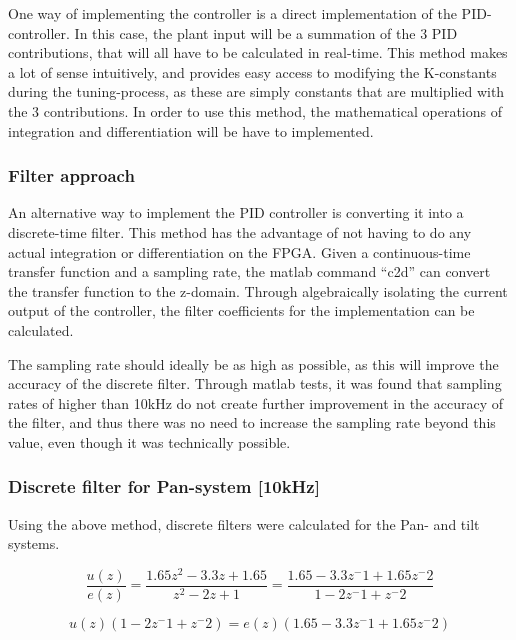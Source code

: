One way of implementing the controller is a direct implementation of the PID-controller. In this case, the plant input will be a summation of the 3 PID contributions, that will all have to be calculated in real-time. This method makes a lot of sense intuitively, and provides easy access to modifying the K-constants during the tuning-process, as these are simply constants that are multiplied with the 3 contributions. In order to use this method, the mathematical operations of integration and differentiation will be have to implemented.


\subsubsection{Filter approach}

An alternative way to implement the PID controller is converting it into a discrete-time filter. This method has the advantage of not having to do any actual integration or differentiation on the FPGA. Given a continuous-time transfer function and a sampling rate, the matlab command “c2d” can convert the transfer function to the z-domain. Through algebraically isolating the current output of the controller, the filter coefficients for the implementation can be calculated.\par

The sampling rate should ideally be as high as possible, as this will improve the accuracy of the discrete filter. Through matlab tests, it was found that sampling rates of higher than 10kHz do not create further improvement in the accuracy of the filter, and thus there was no need to increase the sampling rate beyond this value, even though it was technically possible.

\subsubsection{Discrete filter for Pan-system [10kHz]}

Using the above method, discrete filters were calculated for the Pan- and tilt systems.

\begin{equation}
\frac{u(z)}{e(z)}=\frac{1.65z^2-3.3z+1.65}{z^2-2z+1}=\frac{1.65-3.3z^-1+1.65z^-2}{1-2z^-1+z^-2}
\end{equation}

\begin{equation}
u(z)(1-2z^-1+z^-2)=e(z)(1.65-3.3z^-1+1.65z^-2)
\end{equation}


